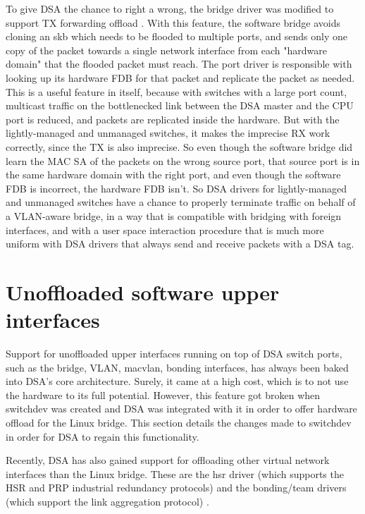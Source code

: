 \documentclass[letterpaper]{article}
\begin{document}
To give DSA the chance to right a wrong, the bridge driver was modified to
support TX forwarding offload \cite{bridge-tx-fwd-offload}. With this feature,
the software bridge avoids cloning an skb which needs to be flooded to multiple
ports, and sends only one copy of the packet towards a single network interface
from each "hardware domain" that the flooded packet must reach. The port driver
is responsible with looking up its hardware FDB for that packet and replicate
the packet as needed.  This is a useful feature in itself, because with
switches with a large port count, multicast traffic on the bottlenecked link
between the DSA master and the CPU port is reduced, and packets are replicated
inside the hardware.  But with the lightly-managed and unmanaged switches, it
makes the imprecise RX work correctly, since the TX is also imprecise. So even
though the software bridge did learn the MAC SA of the packets on the wrong
source port, that source port is in the same hardware domain with the right
port, and even though the software FDB is incorrect, the hardware FDB isn't. So
DSA drivers for lightly-managed and unmanaged switches have a chance to
properly terminate traffic on behalf of a VLAN-aware bridge, in a way that is
compatible with bridging with foreign interfaces, and with a user space
interaction procedure that is much more uniform with DSA drivers that always
send and receive packets with a DSA tag.

\section{Unoffloaded software upper interfaces}

Support for unoffloaded upper interfaces running on top of DSA switch ports,
such as the bridge, VLAN, macvlan, bonding interfaces, has always been baked
into DSA's core architecture. Surely, it came at a high cost, which is to not
use the hardware to its full potential. However, this feature got broken when
switchdev was created and DSA was integrated with it in order to offer hardware
offload for the Linux bridge. This section details the changes made to
switchdev in order for DSA to regain this functionality.

Recently, DSA has also gained support for offloading other virtual network
interfaces than the Linux bridge. These are the hsr driver (which supports the
HSR and PRP industrial redundancy protocols) \cite{dsa-hsr} and the
bonding/team drivers (which support the link aggregation protocol)
\cite{dsa-lag}.
\end{document}
